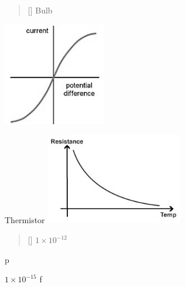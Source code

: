 \documentclass[grid,avery5371]{flashcards}
\begin{document}
\begin{flashcard}[]{%
\begin{verse}[\versewidth]
\Huge{Bulb}
\end{verse}}
\includegraphics[width=4.5cm, height=4.5cm]{Bulb.jpg}
\end{flashcard}

\begin{flashcard}[]{%
\Huge{Thermistor}}
\includegraphics[width=6cm, height=4cm]{Thermistor.jpg}
\end{flashcard}

\begin{flashcard}[Pico]{
\begin{verse}[\versewidth]
\Huge{$1\times10^{-12}$}
\end{verse}}
p
\end{flashcard}

\begin{flashcard}[Femto]{\Huge{$1\times10^{-15}$}}
f
\end{flashcard}
\end{document}
